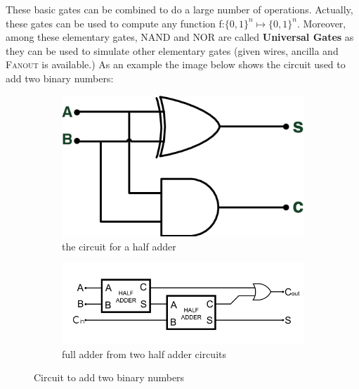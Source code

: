 These basic gates can be combined to do a large number of operations. Actually, these gates can be used to compute any function f:{$\{0, 1\}^n \longmapsto \{0, 1\}^n$}. Moreover, among these elementary gates, {\scshape NAND} and {\scshape NOR} are called {\bf Universal Gates} as they can be used to simulate other elementary gates (given wires, ancilla and {\scshape Fanout} is available.) As an example the image below shows the circuit used to add two binary numbers:\\
\begin{figure}[h]	
	\begin{subfigure}[b]{0.5\linewidth}
	\includegraphics[width=1\textwidth]{images/halfadder.png}\par
	\caption{the circuit for a half adder}
 	\end{subfigure}
	\begin{subfigure}[b]{0.5\linewidth}
	\includegraphics[width=1\textwidth]{images/fulladder.png}\par
	\caption{full adder from two half adder circuits}
 	\end{subfigure}
\label{fig:gate}
\caption{Circuit to add two binary numbers}
\end{figure}
